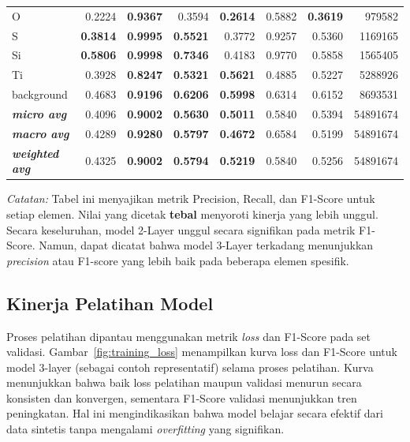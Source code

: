 \begin{table}[H]
\begin{threeparttable}
\begin{tabular}{l rrr rrr r}
        O  & 0.2224 & \textbf{0.9367} & 0.3594 & \textbf{0.2614} & 0.5882 & \textbf{0.3619} & 979582 \\
        S  & \textbf{0.3814} & \textbf{0.9995} & \textbf{0.5521} & 0.3772 & 0.9257 & 0.5360 & 1169165 \\
        Si & \textbf{0.5806} & \textbf{0.9998} & \textbf{0.7346} & 0.4183 & 0.9770 & 0.5858 & 1565405 \\
        Ti & 0.3928 & \textbf{0.8247} & \textbf{0.5321} & \textbf{0.5621} & 0.4885 & 0.5227 & 5288926 \\
        background & 0.4683 & \textbf{0.9196} & \textbf{0.6206} & \textbf{0.5998} & 0.6314 & 0.6152 & 8693531 \\
        \midrule
        \textbf{\textit{micro avg}}    & 0.4096 & \textbf{0.9002} & \textbf{0.5630} & \textbf{0.5011} & 0.5840 & 0.5394 & 54891674 \\
        \textbf{\textit{macro avg}}    & 0.4289 & \textbf{0.9280} & \textbf{0.5797} & \textbf{0.4672} & 0.6584 & 0.5199 & 54891674 \\
        \textbf{\textit{weighted avg}} & 0.4325 & \textbf{0.9002} & \textbf{0.5794} & \textbf{0.5219} & 0.5840 & 0.5256 & 54891674 \\
        \bottomrule
    \end{tabular}
    \begin{tablenotes}
      \small
      \item \textit{Catatan:} Tabel ini menyajikan metrik Precision, Recall, dan F1-Score untuk setiap elemen. Nilai yang dicetak \textbf{tebal} menyoroti kinerja yang lebih unggul. Secara keseluruhan, model 2-Layer unggul secara signifikan pada metrik F1-Score. Namun, dapat dicatat bahwa model 3-Layer terkadang menunjukkan \textit{precision} atau F1-score yang lebih baik pada beberapa elemen spesifik.
    \end{tablenotes}
    \end{threeparttable}
\end{table}

\subsection{Kinerja Pelatihan Model}
\par Proses pelatihan dipantau menggunakan metrik \textit{loss} dan F1-Score pada set validasi. Gambar~\ref{fig:training_loss} menampilkan kurva loss dan F1-Score untuk model 3-layer (sebagai contoh representatif) selama proses pelatihan. Kurva menunjukkan bahwa baik loss pelatihan maupun validasi menurun secara konsisten dan konvergen, sementara F1-Score validasi menunjukkan tren peningkatan. Hal ini mengindikasikan bahwa model belajar secara efektif dari data sintetis tanpa mengalami \textit{overfitting} yang signifikan.

